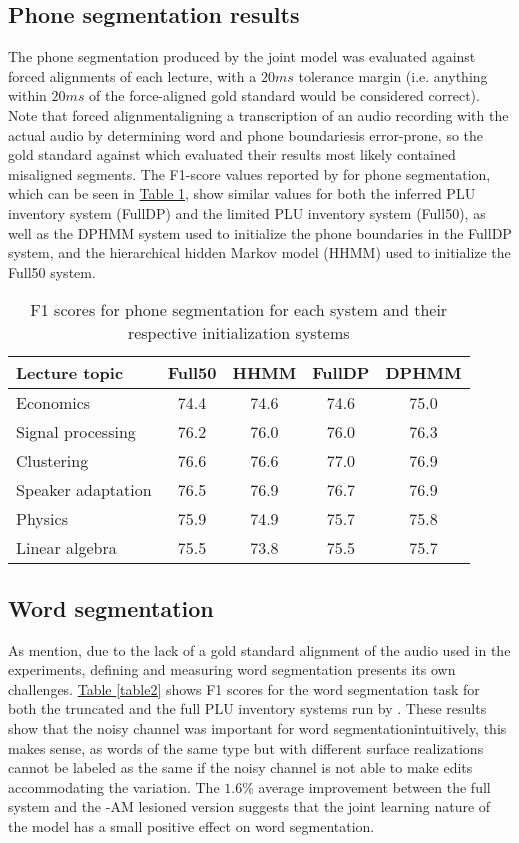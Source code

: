 \documentclass[12pt,letterpaper]{article}
\begin{document}
\subsection{Phone segmentation results}
The phone segmentation produced by the joint model was evaluated against forced alignments of each lecture, with a $20ms$ tolerance margin (i.e. anything within $20ms$ of the force-aligned gold standard would be considered correct). Note that forced alignment\textemdash aligning a transcription of an audio recording with the actual audio by determining word and phone boundaries\textemdash is error-prone, so the gold standard against which \citet{lee:2015} evaluated their results most likely contained misaligned segments. The F1-score values reported by \citet{lee:2015} for phone segmentation, which can be seen in \hyperref[table1]{Table \ref*{table1}}, show similar values for both the inferred PLU inventory system (FullDP) and the limited PLU inventory system (Full50), as well as the DPHMM system used to initialize the phone boundaries in the FullDP system, and the hierarchical hidden Markov model (HHMM) used to initialize the Full50 system. 
\begin{table}
\begin{tabular}{|l|c|c||c|c|}
\hline
Lecture topic&Full50&HHMM&FullDP&DPHMM\\
\hline \hline
Economics&74.4&74.6&74.6&75.0\\
\hline
Signal processing&76.2&76.0&76.0&76.3\\
\hline
Clustering&76.6&76.6&77.0&76.9\\
\hline
Speaker adaptation&76.5&76.9&76.7&76.9\\
\hline
Physics&75.9&74.9&75.7&75.8\\
\hline
Linear algebra&75.5&73.8&75.5&75.7\\
\hline

\end{tabular}
\caption{F1 scores for phone segmentation for each system and their respective initialization systems \protect\citep{lee:2015}}
\label{table1}
\end{table}

\subsection{Word segmentation}
As \citet{lee:2015} mention, due to the lack of a gold standard alignment of the audio used in the experiments, defining and measuring word segmentation presents its own challenges.  \hyperref[table2]{Table \ref*{table2}} shows F1 scores for the word segmentation task for both the truncated and the full PLU inventory systems run by \citet{lee:2015}. These results show that the noisy channel was important for word segmentation\textemdash intuitively, this makes sense, as words of the same type but with different surface realizations cannot be labeled as the same if the noisy channel is not able to make edits accommodating the variation. The $1.6\%$ average improvement between the full system and the -AM lesioned version suggests that the joint learning nature of the model has a small positive effect on word segmentation.
\end{document}
